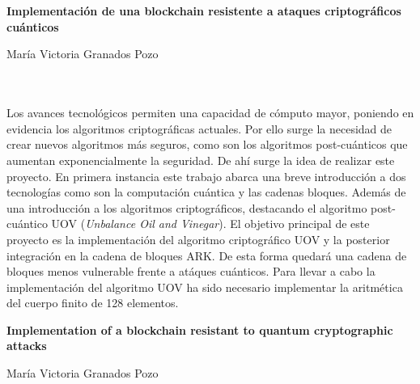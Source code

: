 \chapter*{}






\cleardoublepage
\thispagestyle{empty}

\begin{center}
{\large\bfseries Implementación de una blockchain resistente a ataques criptográficos cuánticos}\\
\end{center}
\begin{center}
María Victoria Granados Pozo\\
\end{center}

\\

\vspace{0.7cm}
\\

Los avances tecnológicos permiten una capacidad de cómputo mayor, poniendo en evidencia los algoritmos criptográficas actuales. Por ello surge la necesidad de crear nuevos algoritmos más seguros, como son los algoritmos post-cuánticos que aumentan exponencialmente la seguridad. De ahí surge la idea de realizar este proyecto. En primera instancia este trabajo abarca una  breve introducción a dos tecnologías como son la computación cuántica y las cadenas bloques. Además de una introducción a los algoritmos criptográficos, destacando el algoritmo post-cuántico UOV (\textit{Unbalance Oil and Vinegar}). El objetivo principal de este proyecto es la implementación del algoritmo criptográfico UOV  y la posterior integración en la cadena de bloques ARK. De esta forma quedará una cadena de bloques menos vulnerable frente a atáques cuánticos. Para llevar a cabo la implementación del algoritmo UOV ha sido necesario implementar la aritmética del cuerpo finito de 128 elementos.\\
\cleardoublepage


\thispagestyle{empty}


\begin{center}
{\large\bfseries Implementation of a blockchain resistant to quantum cryptographic attacks}\\
\end{center}
\begin{center}
María Victoria Granados Pozo\\
\end{center}

